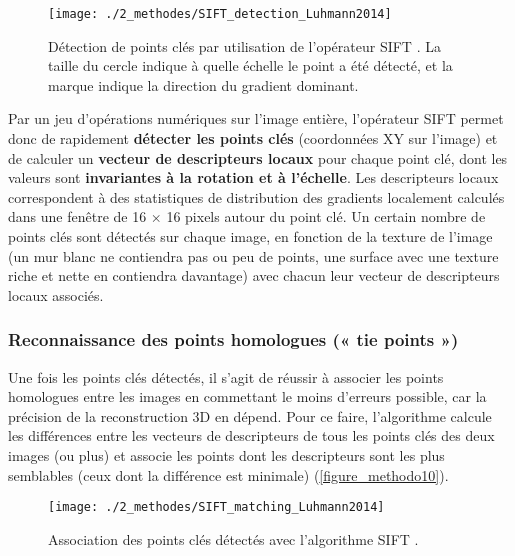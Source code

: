 \begin{figure}[H]
	\begin{center}
	\texttt{[image: ./2\_methodes/SIFT\_detection\_Luhmann2014]}
		\caption[Détection de points clés par utilisation de l’opérateur SIFT]{Détection de points clés par utilisation de l’opérateur SIFT \citep{luhmann_close-range_2014}. La taille du cercle indique à quelle échelle le point a été détecté, et la marque indique la direction du gradient dominant.}
	\label{figure_methodo9}
\end{center}
\end{figure}

Par un jeu d’opérations numériques sur l’image entière, l’opérateur SIFT permet donc de rapidement \textbf{détecter les points clés} (coordonnées XY sur l’image) et de calculer un \textbf{vecteur de descripteurs locaux} pour chaque point clé, dont les valeurs sont \textbf{invariantes à la rotation et à l’échelle}. Les descripteurs locaux correspondent à des statistiques de distribution des gradients localement calculés dans une fenêtre de 16 $\times$ 16 pixels autour du point clé. Un certain nombre de points clés sont détectés sur chaque image, en fonction de la texture de l’image (un mur blanc ne contiendra pas ou peu de points, une surface avec une texture riche et nette en contiendra davantage) avec chacun leur vecteur de descripteurs locaux associés.

\subsubsection{Reconnaissance des points homologues (« tie points »)}

Une fois les points clés détectés, il s’agit de réussir à associer les points homologues entre les images en commettant le moins d’erreurs possible, car la précision de la reconstruction 3D en dépend. Pour ce faire, l’algorithme calcule les différences entre les vecteurs de descripteurs de tous les points clés des deux images (ou plus) et associe les points dont les descripteurs sont les plus semblables (ceux dont la différence est minimale) (\autoref{figure_methodo10}). 

\begin{figure}[H]
	\begin{center}
	\texttt{[image: ./2\_methodes/SIFT\_matching\_Luhmann2014]}
		\caption[Association des points clés détectés avec l’algorithme SIFT]{Association des points clés détectés avec l’algorithme SIFT \citep{luhmann_close-range_2014}.}
	\label{figure_methodo10}
\end{center}
\end{figure}

